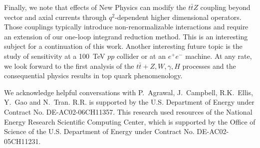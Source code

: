 \documentclass{JHEP3}
\def\ttbZ{t\bar{t}Z}
\def\ttb{t\bar{t}}
\begin{document}
Finally, we note that effects of New Physics can modify the $\ttbZ$ coupling beyond vector and axial currents through $q^2$-dependent  higher dimensional operators. 
Those couplings typically introduce non-renormalizable interactions and require an extension of our one-loop integrand reduction method. 
This is an interesting subject for a continuation of this work.
Another interesting future topic is the study of sensitivity at a 100~TeV $pp$ collider or at an $e^+ e^-$ machine.
At any rate, we look forward to the first analysis of the $\ttb+Z,W,\gamma,H$ processes and the consequential physics results in top quark phenomenology.



\acknowledgments
We acknowledge helpful conversations with P.~Agrawal, J.~Campbell, R.K.~Ellis, Y.~Gao and N.~Tran. R.R. is supported by the U.S. Department of Energy under Contract No. DE-AC02-06CH11357. This research used resources of the National Energy Research Scientific Computing Center, which is supported by the Office of Science of the U.S. Department of Energy under Contract No. DE-AC02-05CH11231.





\end{document}

